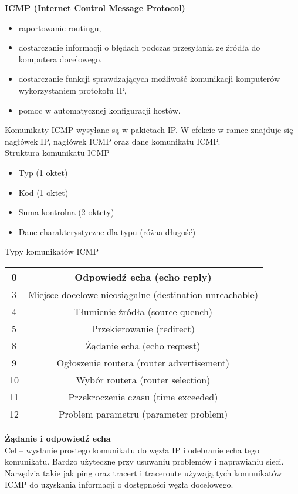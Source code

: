\documentclass[../main.tex]{subfiles}
\begin{document}
    \textbf{ICMP (Internet Control Message Protocol)}\\
    \begin{itemize}
        \item raportowanie routingu,
        \item dostarczanie informacji o błędach podczas przesyłania ze źródła do komputera docelowego,
        \item dostarczanie funkcji sprawdzających możliwość komunikacji komputerów wykorzystaniem protokołu IP,
        \item pomoc w automatycznej konfiguracji hostów.
    \end{itemize}
    Komunikaty ICMP wysyłane są w pakietach IP. W efekcie w ramce znajduje się nagłówek IP, nagłówek ICMP oraz dane komunikatu ICMP.\\

    Struktura komunikatu ICMP
    \begin{itemize}
        \item Typ (1 oktet)
        \item Kod (1 oktet)
        \item Suma kontrolna (2 oktety)
        \item Dane charakterystyczne dla typu (różna długość)
    \end{itemize}

    Typy komunikatów ICMP
    \begin{tabular}{|c|c|}
        \hline
        0 & Odpowiedź echa (echo reply)\\
        \hline
        3 & Miejsce docelowe nieosiągalne (destination unreachable)\\
        \hline
        4 & Tłumienie źródła (source quench)\\
        \hline
        5 & Przekierowanie (redirect)\\
        \hline
        8 & Żądanie echa (echo request)\\
        \hline
        9 & Ogłoszenie routera (router advertisement)\\
        \hline
        10 & Wybór routera (router selection)\\
        \hline
        11 & Przekroczenie czasu (time exceeded)\\
        \hline
        12 & Problem parametru (parameter problem)\\
        \hline
    \end{tabular}

    \textbf{Żądanie i odpowiedź echa}\\
    Cel – wysłanie prostego komunikatu do węzła IP i odebranie echa tego komunikatu. Bardzo
    użyteczne przy usuwaniu problemów i naprawianiu sieci. Narzędzia takie jak ping oraz tracert i traceroute używają tych komunikatów ICMP do
    uzyskania informacji o dostępności węzła docelowego.\\
\end{document}
